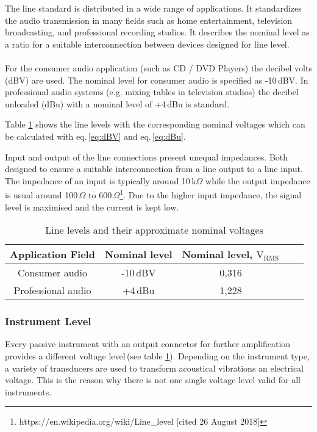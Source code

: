 The line standard is distributed in a wide range of applications.
It standardizes the audio transmission in many fields such as
home entertainment, television broadcasting, and professional recording studios.
It describes the nominal level as a ratio for a suitable interconnection between
devices designed for line level.\\
\\
For the consumer audio application (such as CD / DVD Players) the decibel volts (dBV) are used.
The nominal level for consumer audio is specified as -10\,dBV.
In professional audio systems (e.g. mixing tables in television studios) the decibel unloaded (dBu) with
a nominal level of +4\,dBu is standard.

Table \ref{tab:LineLevels} shows the line levels with the corresponding nominal voltages which can be calculated with eq.\,\ref{eq:dBV} and eq.\,\ref{eq:dBu}.

Input and output of the line connections present unequal impedances.
Both designed to ensure a suitable interconnection from a line output to a line input.
The impedance of an input is typically around 10\,k$\Omega$ while the output impedance is usual
around 100\,$\Omega$ to 600\,$\Omega$\footnote{https://en.wikipedia.org/wiki/Line\_level [cited 26 August 2018]}.
Due to the higher input impedance, the signal level is maximised and the current is kept low.

\begin{table}[H]
\begin{center}
\begin{tabular}{|c|c|c|c|c|}
\hline 
\textbf{Application Field} & \textbf{Nominal level} & \textbf{Nominal level, $\mathrm{V}_{\mathrm{RMS}}$}  \\ 
\hline 
\hline 
Consumer audio & -10\,dBV & 0,316 \\ 
\hline 
Professional audio & +4\,dBu & 1,228 \\ 
\hline 
\end{tabular} 
\caption[ui]{Line levels and their approximate nominal voltages}
\end{center}
\label{tab:LineLevels}
\end{table}

\subsubsection{Instrument Level}

Every passive instrument with an output connector for further amplification provides a
different voltage level\,(see table \ref{tab:LineLevels}). Depending on the instrument type, a variety of transducers are used to transform acoustical vibrations an electrical voltage.
This is the reason why there is not one single voltage level valid for all instruments. 

